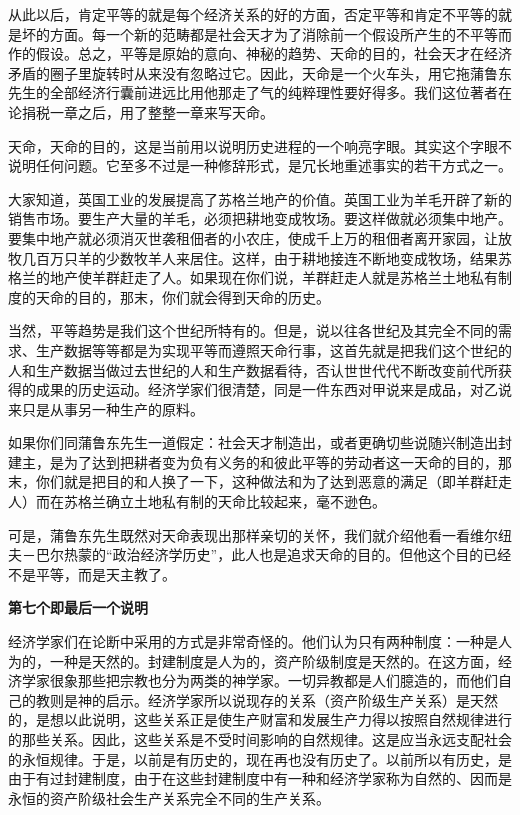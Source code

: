 \documentclass[a4paper,twoside,12pt,AutoFakeBold]{ctexart}
\begin{document}
从此以后，肯定平等的就是每个经济关系的好的方面，否定平等和肯定不平等的就是坏的方面。每一个新的范畴都是社会天才为了消除前一个假设所产生的不平等而作的假设。总之，平等是原始的意向、神秘的趋势、天命的目的，社会天才在经济矛盾的圈子里旋转时从来没有忽略过它。因此，天命是一个火车头，用它拖蒲鲁东先生的全部经济行囊前进远比用他那走了气的纯粹理性要好得多。我们这位著者在论捐税一章之后，用了整整一章来写天命。

天命，天命的目的，这是当前用以说明历史进程的一个响亮字眼。其实这个字眼不说明任何问题。它至多不过是一种修辞形式，是冗长地重述事实的若干方式之一。

大家知道，英国工业的发展提高了苏格兰地产的价值。英国工业为羊毛开辟了新的销售市场。要生产大量的羊毛，必须把耕地变成牧场。要这样做就必须集中地产。要集中地产就必须消灭世袭租佃者的小农庄，使成千上万的租佃者离开家园，让放牧几百万只羊的少数牧羊人来居住。这样，由于耕地接连不断地变成牧场，结果苏格兰的地产使羊群赶走了人。如果现在你们说，羊群赶走人就是苏格兰土地私有制度的天命的目的，那末，你们就会得到天命的历史。

当然，平等趋势是我们这个世纪所特有的。但是，说以往各世纪及其完全不同的需求、生产数据等等都是为实现平等而遵照天命行事，这首先就是把我们这个世纪的人和生产数据当做过去世纪的人和生产数据看待，否认世世代代不断改变前代所获得的成果的历史运动。经济学家们很清楚，同是一件东西对甲说来是成品，对乙说来只是从事另一种生产的原料。

如果你们同蒲鲁东先生一道假定：社会天才制造出，或者更确切些说随兴制造出封建主，是为了达到把耕者变为负有义务的和彼此平等的劳动者这一天命的目的，那末，你们就是把目的和人换了一下，这种做法和为了达到恶意的满足（即羊群赶走人）而在苏格兰确立土地私有制的天命比较起来，毫不逊色。

可是，蒲鲁东先生既然对天命表现出那样亲切的关怀，我们就介绍他看一看维尔纽夫－巴尔热蒙的“政治经济学历史”，此人也是追求天命的目的。但他这个目的已经不是平等，而是天主教了。

\begin{center}
    \textbf{第七个即最后一个说明}
\end{center}

经济学家们在论断中采用的方式是非常奇怪的。他们认为只有两种制度：一种是人为的，一种是天然的。封建制度是人为的，资产阶级制度是天然的。在这方面，经济学家很象那些把宗教也分为两类的神学家。一切异教都是人们臆造的，而他们自己的教则是神的启示。经济学家所以说现存的关系（资产阶级生产关系）是天然的，是想以此说明，这些关系正是使生产财富和发展生产力得以按照自然规律进行的那些关系。因此，这些关系是不受时间影响的自然规律。这是应当永远支配社会的永恒规律。于是，以前是有历史的，现在再也没有历史了。以前所以有历史，是由于有过封建制度，由于在这些封建制度中有一种和经济学家称为自然的、因而是永恒的资产阶级社会生产关系完全不同的生产关系。
\end{document}
